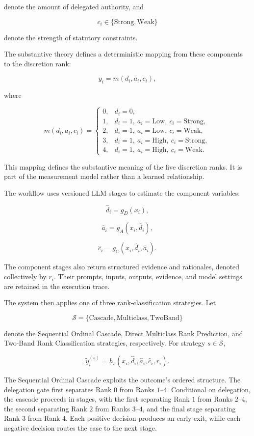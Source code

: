 denote the amount of delegated authority, and

\[
c_i \in \{\mathrm{Strong},\mathrm{Weak}\}
\]

denote the strength of statutory constraints.

The substantive theory defines a deterministic mapping from these
components to the discretion rank:

\[
y_i = m(d_i,a_i,c_i),
\]

where

\[
m(d_i,a_i,c_i)=
\begin{cases}
0, & d_i=0,\\
1, & d_i=1,\ a_i=\mathrm{Low},\ c_i=\mathrm{Strong},\\
2, & d_i=1,\ a_i=\mathrm{Low},\ c_i=\mathrm{Weak},\\
3, & d_i=1,\ a_i=\mathrm{High},\ c_i=\mathrm{Strong},\\
4, & d_i=1,\ a_i=\mathrm{High},\ c_i=\mathrm{Weak}.
\end{cases}
\]

This mapping defines the substantive meaning of the five discretion
ranks. It is part of the measurement model rather than a learned
relationship.

The workflow uses versioned LLM stages to estimate the component
variables:

\[
\hat d_i = g_D(x_i),
\]

\[
\hat a_i = g_A(x_i,\hat d_i),
\]

\[
\hat c_i = g_C(x_i,\hat d_i,\hat a_i).
\]

The component stages also return structured evidence and rationales,
denoted collectively by \(r_i\). Their prompts, inputs, outputs,
evidence, and model settings are retained in the execution trace.

The system then applies one of three rank-classification strategies.
Let

\[
\mathcal{S}
=
\{\mathrm{Cascade},\mathrm{Multiclass},\mathrm{TwoBand}\}
\]

denote the Sequential Ordinal Cascade, Direct Multiclass Rank
Prediction, and Two-Band Rank Classification strategies, respectively. For strategy
\(s \in \mathcal{S}\),

\[
\tilde y_i^{(s)}
=
h_s(x_i,\hat d_i,\hat a_i,\hat c_i,r_i).
\]

The Sequential Ordinal Cascade exploits the outcome's ordered structure. The delegation gate first separates Rank \(0\) from Ranks \(1\)--\(4\). Conditional on delegation, the cascade proceeds in stages, with the first separating Rank \(1\) from Ranks \(2\)--\(4\), the second separating Rank \(2\) from Ranks \(3\)--\(4\), and the final stage separating Rank \(3\) from Rank \(4\). Each positive decision produces an early exit, while each negative decision routes the case to the next stage.

